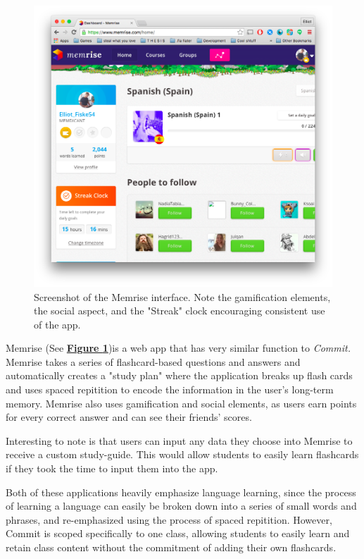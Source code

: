 \begin{figure}
	\centering
	\includegraphics[width=1.0\linewidth]{memrise}
	\caption[Memrise]{Screenshot of the Memrise interface. Note the gamification elements, the social aspect, and the "Streak" clock encouraging consistent use of the app.}
	\label{fig:memrise}
\end{figure}

\par Memrise (See \textbf{\hyperref[fig:memrise]{Figure \ref*{fig:memrise}}})is a web app that has very similar function to \textit{Commit.} Memrise takes a series of flashcard-based questions and answers and automatically creates a "study plan" where the application breaks up flash cards and uses spaced repitition to encode the information in the user's long-term memory. Memrise also uses gamification and social elements, as users earn points for every correct answer and can see their friends' scores.

\par Interesting to note is that users can input any data they choose into Memrise to receive a custom study-guide. This would allow students to easily learn flashcards if they took the time to input them into the app.

\par Both of these applications heavily emphasize language learning, since the process of learning a language can easily be broken down into a series of small words and phrases, and re-emphasized using the process of spaced repitition. However, Commit is scoped specifically to one class, allowing students to easily learn and retain class content without the commitment of adding their own flashcards.

